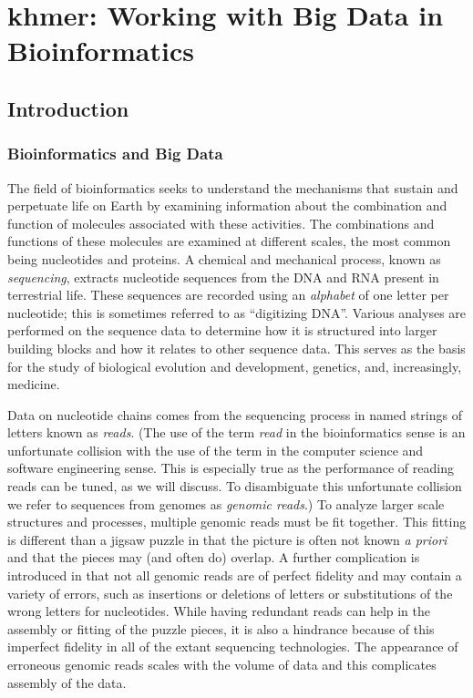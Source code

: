 \chapter{khmer: Working with Big Data in Bioinformatics}
\section{Introduction}

\subsection{Bioinformatics and Big Data}

The field of bioinformatics seeks to understand the mechanisms that sustain and
perpetuate life on Earth by examining information about the combination and
function of molecules associated with these activities. The combinations and
functions of these molecules are examined at different scales, the most common
being nucleotides and proteins. A chemical and mechanical process, known as
\textit{sequencing}, extracts nucleotide sequences from the DNA and RNA present
in terrestrial life. These sequences are recorded using an \textit{alphabet} of
one letter per nucleotide; this is sometimes referred to as ``digitizing DNA''.
Various analyses are performed on the sequence data to determine how it is
structured into larger building blocks and how it relates to other sequence
data. This serves as the basis for the study of biological evolution and
development, genetics, and, increasingly, medicine.

Data on nucleotide chains comes from the sequencing process in named strings of
letters known as \textit{reads}. (The use of the term \textit{read} in the
bioinformatics sense is an unfortunate collision with the use of the term in
the computer science and software engineering sense. This is especially true as
the performance of reading reads can be tuned, as we will discuss. To
disambiguate this unfortunate collision we refer to sequences from genomes as
\textit{genomic reads}.) To analyze larger scale structures and processes,
multiple genomic reads must be fit together. This fitting is different than a
jigsaw puzzle in that the picture is often not known \textit{a priori} and that
the pieces may (and often do) overlap. A further complication is introduced in
that not all genomic reads are of perfect fidelity and may contain a variety of
errors, such as insertions or deletions of letters or substitutions of the
wrong letters for nucleotides. While having redundant reads can help in the
assembly or fitting of the puzzle pieces, it is also a hindrance because of
this imperfect fidelity in all of the extant sequencing technologies. The
appearance of erroneous genomic reads scales with the volume of data and this
complicates assembly of the data.

